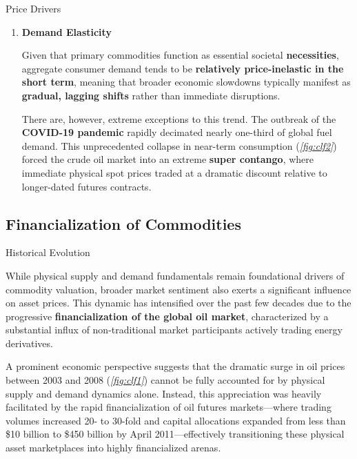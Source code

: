 \documentclass[10pt]{article}
\begin{document}
\begin{core}{Price Drivers}
\begin{enumerate}
        \item \textbf{Demand Elasticity}

        Given that primary commodities function as essential societal \textbf{necessities}, aggregate consumer demand tends to be \textbf{relatively price-inelastic in the short term}, meaning that broader economic slowdowns typically manifest as \textbf{gradual, lagging shifts} rather than immediate disruptions. 

        There are, however, extreme exceptions to this trend. The outbreak of the \textbf{COVID-19 pandemic} rapidly decimated nearly one-third of global fuel demand. This unprecedented collapse in near-term consumption (\textit{\autoref{fig:clf2}}) forced the crude oil market into an extreme \textbf{super contango}, where immediate physical spot prices traded at a dramatic discount relative to longer-dated futures contracts.

      \end{enumerate}

    \end{core}

  \subsection{Financialization of Commodities}
    \label{sec:fin_com}

    \begin{core}{Historical Evolution}

      While physical supply and demand fundamentals remain foundational drivers of commodity valuation, broader market sentiment also exerts a significant influence on asset prices. This dynamic has intensified over the past few decades due to the progressive \textbf{financialization of the global oil market}, characterized by a substantial influx of non-traditional market participants actively trading energy derivatives.

      A prominent economic perspective suggests that the dramatic surge in oil prices between 2003 and 2008 (\textit{\autoref{fig:clf1}}) cannot be fully accounted for by physical supply and demand dynamics alone. Instead, this appreciation was heavily facilitated by the rapid financialization of oil futures markets---where trading volumes increased 20- to 30-fold and capital allocations expanded from less than \$10 billion to \$450 billion by April 2011---effectively transitioning these physical asset marketplaces into highly financialized arenas.


    \end{core}
\end{document}
